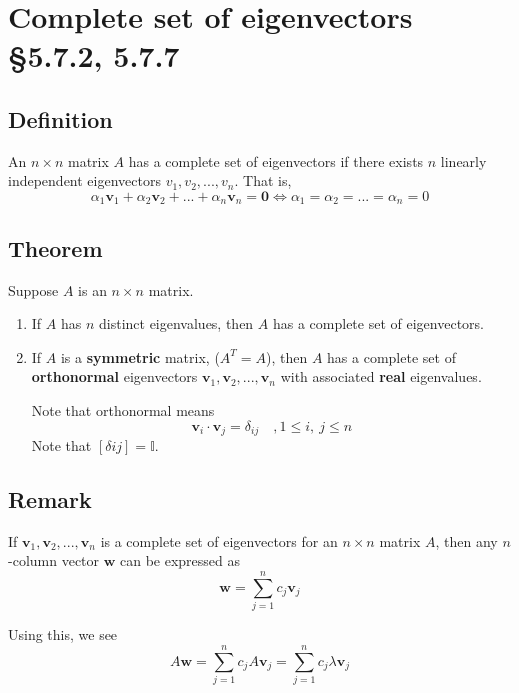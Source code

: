 \documentclass[11pt]{article}
\newcommand{\ident}{\mathbb{I}}
\renewcommand{\vec}[1]{\mathbf{#1}}
\begin{document}
\section{Complete set of eigenvectors §5.7.2, 5.7.7}
\subsection{Definition}
An $n \times n$ matrix $A$ has a complete set of eigenvectors if there exists $n$ linearly independent eigenvectors $v_1, v_2, ..., v_n$. That is, 
\[ \alpha_1 \vec{v}_1 + \alpha_2 \vec{v}_2 + ... + \alpha_n \vec{v}_n = \vec{0} \Leftrightarrow \alpha_1 = \alpha_2 =...=\alpha_n = 0 \]

\subsection{Theorem}
Suppose $A$ is an $n \times n$ matrix.

\begin{enumerate}[ (a) ]
\item If $A$ has $n$ distinct eigenvalues, then $A$ has a complete set of eigenvectors.
\item If $A$ is a \textbf{symmetric} matrix, ($A^T = A$), then $A$ has a complete set of \textbf{orthonormal} eigenvectors $\vec{v}_1, \vec{v}_2, ..., \vec{v}_n$ with associated \textbf{real} eigenvalues.

Note that orthonormal means
\[ \vec{v}_i \cdot \vec{v}_j = \delta_{ij} \quad , 1 \leq i,\ j \leq n\]
Note that $[\delta{ij}] = \ident$.
\end{enumerate}

\subsection{Remark}
If $\vec{v}_1, \vec{v}_2, ..., \vec{v}_n$ is a complete set of eigenvectors for an $n \times n$ matrix $A$, then any $n$-column vector $\vec{w}$ can be expressed as
\[ \vec{w} = \sum_{j=1}^n c_j \vec{v}_j \]

Using this, we see
\[ A\vec{w} = \sum_{j=1}^n c_j A \vec{v}_j = \sum_{j=1}^n c_j \lambda \vec{v}_j \]
\end{document}
